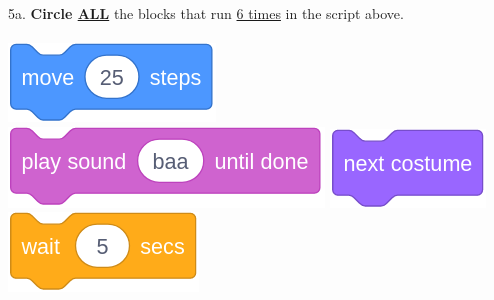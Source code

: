 \documentclass[letterpaper,12pt]{article}
\begin{document}
\noindent 5a. \textbf{Circle \underline{ALL}} the blocks that run \underline{6 times} in the script above. \\ \\
\includegraphics[scale=.3]{q5_script1.png} \hspace{1cm}
\includegraphics[scale=.3]{q5_script2.png} \hspace{1cm}
\includegraphics[scale=.3]{q5_script3.png} \hspace{1cm}
\includegraphics[scale=.3]{q5_script4.png} \hspace{1cm}\\
\end{document}
